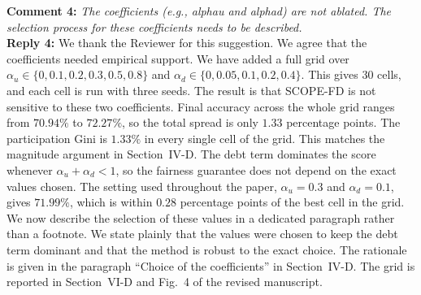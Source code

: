 \documentclass[10pt]{article}
\begin{document}
\noindent
\textbf{Comment 4:} \textit{The coefficients (e.g., alphau and alphad) are not ablated. The selection process for these coefficients needs to be described.} \\
\noindent
\textbf{Reply 4:} {We thank the Reviewer for this suggestion. We agree that the coefficients needed empirical support. We have added a full grid over $\alpha_u \in \{0, 0.1, 0.2, 0.3, 0.5, 0.8\}$ and $\alpha_d \in \{0, 0.05, 0.1, 0.2, 0.4\}$. This gives $30$ cells, and each cell is run with three seeds. The result is that SCOPE-FD is not sensitive to these two coefficients. Final accuracy across the whole grid ranges from $70.94\%$ to $72.27\%$, so the total spread is only $1.33$ percentage points. The participation Gini is $1.33\%$ in every single cell of the grid. This matches the magnitude argument in Section~IV-D. The debt term dominates the score whenever $\alpha_u + \alpha_d < 1$, so the fairness guarantee does not depend on the exact values chosen. The setting used throughout the paper, $\alpha_u = 0.3$ and $\alpha_d = 0.1$, gives $71.99\%$, which is within $0.28$ percentage points of the best cell in the grid. We now describe the selection of these values in a dedicated paragraph rather than a footnote. We state plainly that the values were chosen to keep the debt term dominant and that the method is robust to the exact choice. The rationale is given in the paragraph ``Choice of the coefficients'' in Section~IV-D. The grid is reported in Section~VI-D and Fig.~4 of the revised manuscript.}\\
\end{document}
